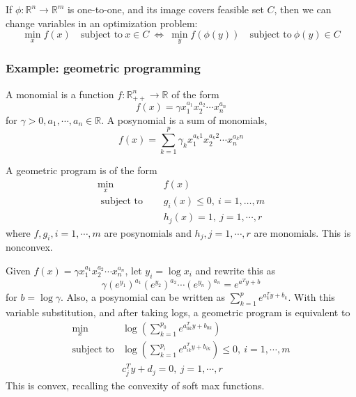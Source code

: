 \documentclass[a4paper]{article}
\begin{document}
{If $\phi : \mathbb{R}^n \rightarrow \mathbb{R}^m$ is one-to-one, and its image covers feasible set $C$, then we can change variables in an optimization problem:
\begin{equation}
  \min_x f(x) \quad \text{subject to} \ x \in C \ \Longleftrightarrow \ \min_y f(\phi(y)) \quad \text{subject to} \ \phi(y) \in C \nonumber
\end{equation}

\subsubsection{Example: geometric programming}
A monomial is a function $f : \mathbb{R}^n_{++} \rightarrow \mathbb{R}$ of the form
\begin{equation}
  f(x) = \gamma x_1^{a_1}x_2^{a_2}\cdots x_n^{a_n} \nonumber
\end{equation}
for $\gamma > 0, a_1, \cdots, a_n \in \mathbb{R}$. A posynomial is a sum of monomials,
\begin{equation}
  f(x) = \sum_{k=1}^{p}\gamma_k x_1^{a_k1}x_2^{a_k2}\cdots x_n^{a_kn} \nonumber
\end{equation}

A geometric program is of the form
\begin{equation}
  \begin{array}{ll}
    \min\limits_{x} & \quad f(x)  \\
    \text { subject to } &\quad g_{i}(x)\leq 0, \ i=1, \ldots, m \\ \nonumber
    & \quad h_j(x) = 1, \ j = 1, \cdots, r
\end{array}
\end{equation}
where $f, g_i, i = 1, \cdots, m$ are posynomials and $h_j, j = 1,\cdots, r$ are monomials. This is nonconvex.

Given $f(x) = \gamma x_1^{a_1}x_2^{a_2}\cdots x_n^{a_n}$, let $y_i = \log x_i$ and rewrite this as 
\begin{equation}
  \gamma (e^{y_1})^{a_1} (e^{y_2})^{a_2}  \cdots (e^{y_n})^{a_n} = e^{a^T y + b} \nonumber 
\end{equation}
for $ b = \log \gamma$. Also, a posynomial can be written as $\sum_{k=1}^p e^{a_k^T y + b_k}$. With this variable substitution, and after taking logs, a geometric program is equivalent to
\begin{equation}
  \begin{array}{ll}
  \min\limits_x  & \log(\sum\limits_{k=1}^{p_0} e^{a_{0k}^T y + b_{0k}}) \\
  \text{subject to}  &  \log(\sum\limits_{k=1}^{p_i} e^{a_{ik}^T y + b_{ik}}) \leq 0, \ i = 1, \cdots, m \\ \nonumber
  & c_j^T y + d_j = 0, \ j = 1, \cdots, r
\end{array}
\end{equation} 
This is convex, recalling the convexity of soft max functions.

}
\end{document}
